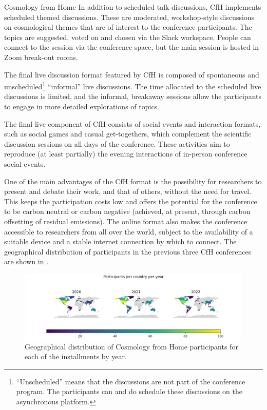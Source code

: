 \documentclass[../SustainableHEP.tex]{subfiles}
\begin{document}
\begin{casestudy}{Cosmology from Home}
In addition to scheduled talk discussions, CfH implements scheduled themed discussions. These are moderated, workshop-style discussions on cosmological themes that are of interest to the conference participants. The topics are suggested, voted on and chosen via the Slack workspace. People can connect to the session via the conference space, but the main session is hosted in Zoom break-out rooms.

The final live discussion format featured by CfH is composed of spontaneous and unscheduled\footnote{“Unscheduled” means that the discussions are not part of the conference program. The participants can and do schedule these discussions on the asynchronous platform.} “informal” live discussions. The time allocated to the scheduled live discussions is limited, and the informal, breakaway sessions allow the participants to engage in more detailed explorations of topics.

The final live component of CfH consists of social events and interaction formats, such as social games and casual get-togethers, which complement the scientific discussion sessions on all days of the conference. These activities aim to reproduce (at least partially) the evening interactions of in-person conference social events.

One of the main advantages of the CfH format is the possibility for researchers to present and debate their work, and that of others, without the need for travel. This keeps the participation costs low and offers the potential for the conference to be carbon neutral or carbon negative (achieved, at present, through carbon offsetting of residual emissions).  The online format also makes the conference accessible to researchers from all over the world, subject to the availability of a suitable device and a stable internet connection by which to connect. The geographical distribution of participants in the previous three CfH conferences are shown in .


\begin{figure}
    \centering
    \captionsetup{type=figure}
    \includegraphics[width=1.\textwidth]{Sections/Figs/Travel/map.png}
    \caption[Geographical distribution of CfH participants for each of the installments by year.]%
        {Geographical distribution of Cosmology from Home participants for each of the installments by year.\label{fig:CfH1}}
\end{figure}


\end{casestudy}
\end{document}
